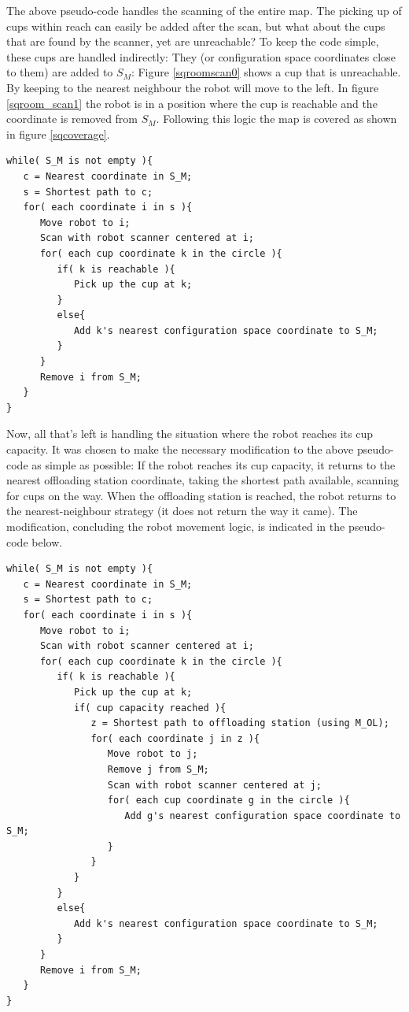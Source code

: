 The above pseudo-code handles the scanning of the entire map.
The picking up of cups within reach can easily be added after the scan,
but what about the cups that are found by the scanner, yet are unreachable?
To keep the code simple, these cups are handled indirectly: They (or configuration space coordinates close to them) are added to \(S_{M}\):
Figure \ref{sqroomscan0} shows a cup that is unreachable. 
By keeping to the nearest neighbour the robot will move to the left. 
In figure \ref{sqroom_scan1} the robot is in a position where the cup is reachable and the coordinate is removed from \(S_{M}\). 
Following this logic the map is covered as shown in figure \ref{sqcoverage}. 

\begin{verbatim}
while( S_M is not empty ){
   c = Nearest coordinate in S_M;
   s = Shortest path to c;
   for( each coordinate i in s ){
      Move robot to i;
      Scan with robot scanner centered at i;
      for( each cup coordinate k in the circle ){
         if( k is reachable ){
            Pick up the cup at k;
         }
         else{
            Add k's nearest configuration space coordinate to S_M;
         }
      }
      Remove i from S_M;
   }
}
\end{verbatim}

Now, all that's left is handling the situation where the robot reaches its cup capacity.
It was chosen to make the necessary modification to the above pseudo-code as simple as possible:
If the robot reaches its cup capacity, it returns to the nearest offloading station coordinate,
taking the shortest path available, scanning for cups on the way. When the offloading station is reached,
the robot returns to the nearest-neighbour strategy (it does not return the way it came).
The modification, concluding the robot movement logic, is indicated in the pseudo-code below.

\begin{verbatim}
while( S_M is not empty ){
   c = Nearest coordinate in S_M;
   s = Shortest path to c;
   for( each coordinate i in s ){
      Move robot to i;
      Scan with robot scanner centered at i;
      for( each cup coordinate k in the circle ){
         if( k is reachable ){
            Pick up the cup at k;
            if( cup capacity reached ){
               z = Shortest path to offloading station (using M_OL);
               for( each coordinate j in z ){
                  Move robot to j;
                  Remove j from S_M;
                  Scan with robot scanner centered at j;
                  for( each cup coordinate g in the circle ){
                     Add g's nearest configuration space coordinate to S_M;
                  }
               }
            }
         }
         else{
            Add k's nearest configuration space coordinate to S_M;
         }
      }
      Remove i from S_M;
   }
}
\end{verbatim}

